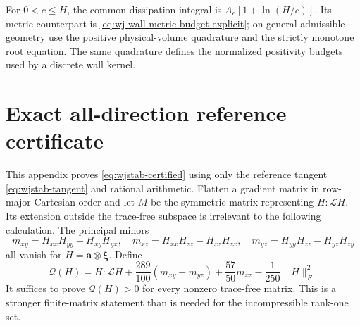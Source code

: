 \documentclass[11pt,a4paper]{article}
\numberwithin{equation}{section}
\begin{document}
For $0<c\leq H$, the common dissipation integral is
$A_e[1+\ln(H/c)]$. Its metric counterpart is
\cref{eq:wj-wall-metric-budget-explicit}; on general admissible geometry
use the positive physical-volume quadrature and the strictly monotone
root equation. The same quadrature defines the normalized positivity
budgets used by a discrete wall kernel.


\section{Exact all-direction reference certificate}
\label{app:wjstab-certificate}

This appendix proves \eqref{eq:wjstab-certified} using only the
reference tangent \eqref{eq:wjstab-tangent} and rational arithmetic.
Flatten a gradient matrix in row-major Cartesian order and let $M$ be
the symmetric matrix representing $H:\mathcal LH$. Its extension
outside the trace-free subspace is irrelevant to the following
calculation. The principal minors
\begin{equation}
 m_{xy}=H_{xx}H_{yy}-H_{xy}H_{yx},\quad
 m_{xz}=H_{xx}H_{zz}-H_{xz}H_{zx},\quad
 m_{yz}=H_{yy}H_{zz}-H_{yz}H_{zy}
 \label{eq:wjstab-minors}
\end{equation}
all vanish for $H=\boldsymbol a\otimes\boldsymbol\xi$. Define
\begin{equation}
 \mathcal Q(H)=H:\mathcal LH
 +\frac{289}{100}(m_{xy}+m_{yz})+\frac{57}{50}m_{xz}
 -\frac1{250}\|H\|_F^2.
 \label{eq:wjstab-proof-form}
\end{equation}
It suffices to prove $\mathcal Q(H)>0$ for every nonzero trace-free
matrix. This is a stronger finite-matrix statement than is needed for
the incompressible rank-one set.
\end{document}

